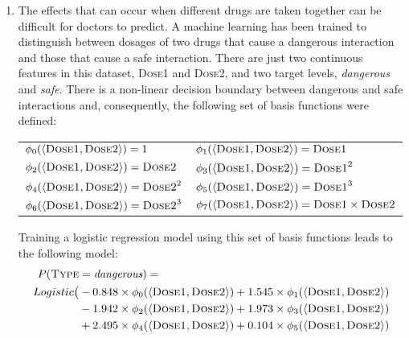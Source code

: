 \documentclass[solution]{ditpaper}
\begin{document}
\begin{enumerate}
		\item The effects that can occur when different drugs are taken together can be difficult for doctors to predict. A machine learning has been trained to distinguish between dosages of two drugs that cause a dangerous interaction and those that cause a safe interaction. There are just two continuous features in this dataset, \textsc{Dose1} and \textsc{Dose2}, and two target levels, \textit{dangerous} and \textit{safe}. There is a non-linear decision boundary between dangerous and safe interactions and, consequently, the following set of basis functions were defined:
	\begin{center}
\begin{tabular}[ht]{ l l }
$\phi_0(\mathbf{\left<\textsc{Dose1}, \textsc{Dose2}\right>}) =  1$ &
$\phi_1(\left<\textsc{Dose1}, \textsc{Dose2}\right>) = \textsc{Dose1}$  \\
$\phi_2(\left<\textsc{Dose1}, \textsc{Dose2}\right>) = \textsc{Dose2}$  &
$\phi_3(\left<\textsc{Dose1}, \textsc{Dose2}\right>) = \textsc{Dose1}^2$ \\
$\phi_4(\left<\textsc{Dose1}, \textsc{Dose2}\right>) = \textsc{Dose2}^2$ &
$\phi_5(\left<\textsc{Dose1}, \textsc{Dose2}\right>) = \textsc{Dose1}^3$ \\
$\phi_6(\left<\textsc{Dose1}, \textsc{Dose2}\right>) = \textsc{Dose2}^3$ &
 $\phi_7(\left<\textsc{Dose1}, \textsc{Dose2}\right>) = \textsc{Dose1} \times \textsc{Dose2}$ \\
\end{tabular}
\end{center}
Training a logistic regression model using this set of basis functions leads to the following model:
			\begin{alignat*}{2}				
P(\textsc{Type}&=\textit{dangerous}) = \\
 Logistic\big(&-0.848\times \phi_0(\mathbf{\left<\textsc{Dose1}, \textsc{Dose2}\right>}) 
  + 1.545 \times\phi_1(\mathbf{\left<\textsc{Dose1}, \textsc{Dose2}\right>})   \\
 & -1.942 \times\phi_2(\mathbf{\left<\textsc{Dose1}, \textsc{Dose2}\right>})
  + 1.973 \times\phi_3(\mathbf{\left<\textsc{Dose1}, \textsc{Dose2}\right>}) \\
 & +  2.495   \times  \phi_4(\mathbf{\left<\textsc{Dose1}, \textsc{Dose2}\right>})
   + 0.104 \times\phi_5(\mathbf{\left<\textsc{Dose1}, \textsc{Dose2}\right>})   \\

\end{alignat*}
\end{enumerate}
\end{document}
